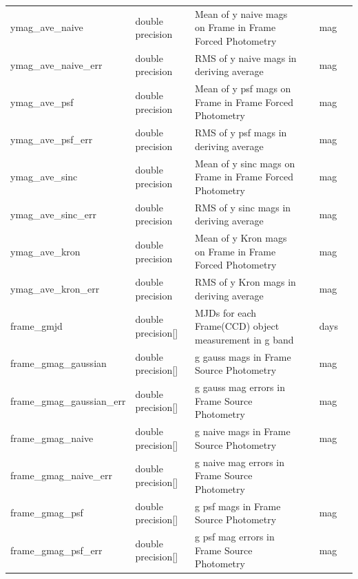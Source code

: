 \documentclass[12pt]{article}
\begin{document}
\begin{table}[thbp]
\begin{center}
{\begin{tabular}{llllll}
ymag\_ave\_naive & double precision & Mean of y naive mags on Frame in Frame Forced Photometry  &                        & mag            &   \\
ymag\_ave\_naive\_err & double precision & RMS of y naive mags in deriving average               &                        & mag            &   \\
ymag\_ave\_psf & double precision & Mean of y psf mags on Frame in Frame Forced Photometry      &                        & mag            &   \\
ymag\_ave\_psf\_err & double precision & RMS of y psf mags in deriving average               &                        & mag            &   \\
ymag\_ave\_sinc & double precision & Mean of y sinc mags on Frame in Frame Forced Photometry      &                        & mag            &   \\
ymag\_ave\_sinc\_err & double precision & RMS of y sinc mags in deriving average               &                        & mag            &   \\
ymag\_ave\_kron & double precision & Mean of y Kron mags on Frame in Frame Forced Photometry      &                        & mag            &   \\
ymag\_ave\_kron\_err & double precision & RMS of y Kron mags in deriving average               &                        & mag            &   \\
frame\_gmjd & double precision[] & MJDs for each Frame(CCD) object measurement in g band     &                        & days            &   \\
frame\_gmag\_gaussian & double precision[] & g gauss mags in Frame Source Photometry          &                        & mag            &   \\
frame\_gmag\_gaussian\_err & double precision[] & g gauss mag errors in Frame Source Photometry          &                        & mag            &   \\
frame\_gmag\_naive & double precision[] & g naive mags in Frame Source Photometry          &                        & mag            &   \\
frame\_gmag\_naive\_err & double precision[] & g naive mag errors in Frame Source Photometry          &                        &             &   \\
frame\_gmag\_psf & double precision[] & g psf mags in Frame Source Photometry          &                        & mag            &   \\
frame\_gmag\_psf\_err & double precision[] & g psf mag errors in Frame Source Photometry          &                        & mag            &   \\

\end{tabular}}
\end{center}
\end{table}
\end{document}
